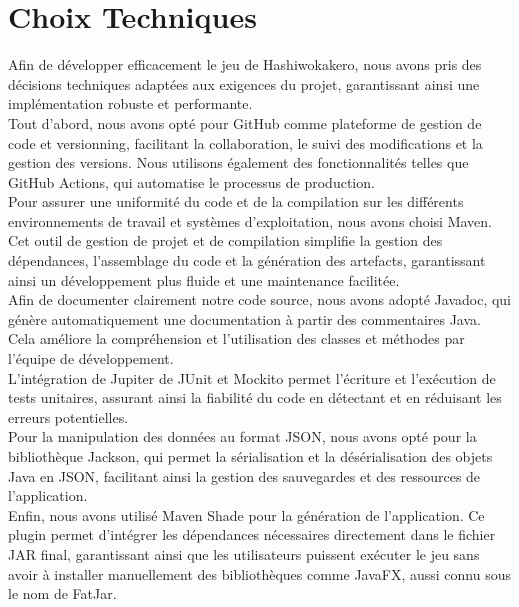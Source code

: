 \section{Choix Techniques}  

Afin de développer efficacement le jeu de Hashiwokakero, nous avons pris des décisions techniques adaptées aux exigences du projet, garantissant ainsi une implémentation robuste et performante.\\  

Tout d’abord, nous avons opté pour GitHub comme plateforme de gestion de code et versionning, facilitant la collaboration, le suivi des modifications et la gestion des versions. Nous utilisons également des fonctionnalités telles que GitHub Actions, qui automatise le processus de production.\\  

Pour assurer une uniformité du code et de la compilation sur les différents environnements de travail et systèmes d’exploitation, nous avons choisi Maven. Cet outil de gestion de projet et de compilation simplifie la gestion des dépendances, l’assemblage du code et la génération des artefacts, garantissant ainsi un développement plus fluide et une maintenance facilitée.\\  

Afin de documenter clairement notre code source, nous avons adopté Javadoc, qui génère automatiquement une documentation à partir des commentaires Java. Cela améliore la compréhension et l’utilisation des classes et méthodes par l’équipe de développement.\\  

L’intégration de Jupiter de JUnit et Mockito permet l’écriture et l’exécution de tests unitaires, assurant ainsi la fiabilité du code en détectant et en réduisant les erreurs potentielles.\\  

Pour la manipulation des données au format JSON, nous avons opté pour la bibliothèque Jackson, qui permet la sérialisation et la désérialisation des objets Java en JSON, facilitant ainsi la gestion des sauvegardes et des ressources de l’application.\\  

Enfin, nous avons utilisé Maven Shade pour la génération de l’application. Ce plugin permet d’intégrer les dépendances nécessaires directement dans le fichier JAR final, garantissant ainsi que les utilisateurs puissent exécuter le jeu sans avoir à installer manuellement des bibliothèques comme JavaFX, aussi connu sous le nom de FatJar.\\  

